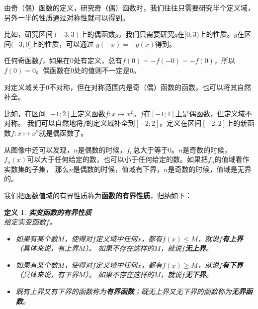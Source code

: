\documentclass[12pt,UTF8]{ctexbook}
\newtheorem{df}{定义}[section]
\begin{document}
由奇（偶）函数的定义，研究奇（偶）函数时，我们往往只需要研究半个定义域，另外一半的性质通过对称性就可以得到。

比如，研究区间$(-3;3)$上的偶函数$g$，我们只需要研究$g$在$[0;3)$上的性质。$g$在区间$(-3;0]$上的性质，可以通过
$g(-x) = -g(x)$得到。

任何奇函数$f$，如果在$0$处有定义，总有$f(0) = - f(-0) = - f(0)$，所以$f(0) = 0$。偶函数在$0$处的值则不一定是$0$。

对定义域关于$0$不对称，但在对称范围内是奇（偶）函数的函数，也可以将其自然补全。

比如，在区间$[-1;2]$上定义函数$f: x\mapsto x^2$。$f$在$[-1;1]$上是偶函数，但定义域不对称。
我们可以自然地将$f$的定义域补全到$[-2;2]$。定义在区间$[-2;2]$上的新函数$f: x\mapsto x^2$就是偶函数了。

从图像中还可以发现，$n$是偶数的时候，$f_n$总大于等于$0$。$n$是奇数的时候，
$f_n(x)$可以大于任何给定的数，也可以小于任何给定的数。如果把$f_n$的值域看作实数集的子集，
那么$n$是偶数的时候，值域有下界，$n$是奇数的时候，值域是无界的。

我们把函数值域的有界性质称为\textbf{函数的有界性质}，归纳如下：
\begin{df}\textbf{实变函数的有界性质}\\
    给定实变函数$f$。
    \begin{itemize}
        \item 如果有某个数$M$，使得对$f$定义域中任何$x$，都有$f(x)\leqslant M$，就说$f$\textbf{有上界} （具体来说，有上界$M$）。
        如果不存在这样的$M$，就说$f$\textbf{无上界}。
        \item 如果有某个数$M$，使得对$f$定义域中任何$x$，都有$f(x)\geqslant M$，就说$f$\textbf{有下界} （具体来说，有下界$M$）。
        如果不存在这样的$M$，就说$f$\textbf{无下界}。
        \item 既有上界又有下界的函数称为\textbf{有界函数}；既无上界又无下界的函数称为\textbf{无界函数}。
    \end{itemize}
\end{df}
\end{document}
